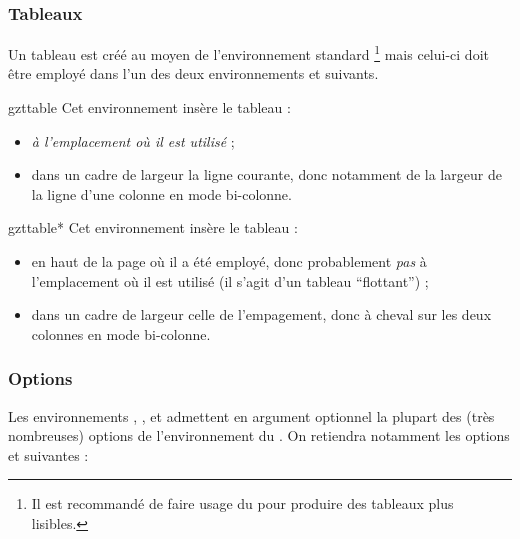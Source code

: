 \subsubsection{Tableaux}
\label{sec-tableaux}

Un tableau est créé au moyen de l'environnement standard
\footnote{Il est recommandé de faire usage du
   pour produire des tableaux plus lisibles.} mais celui-ci
doit être employé dans l'un des deux environnements  et
 suivants.

\begin{docEnvironment}[doclang/environment content=tableau créé avec \docAuxEnvironment{tabular}]{gzttable}{}
  Cet environnement insère le tableau :
  \begin{itemize}
  \item \emph{à l'emplacement où il est utilisé} ;
  \item dans un cadre de largeur la ligne courante, donc notamment de la largeur
    de la ligne d'une colonne en mode bi-colonne.
  \end{itemize}
\end{docEnvironment}

\begin{docEnvironment}[doclang/environment content=tableau créé avec \docAuxEnvironment{tabular}]{gzttable*}{}
  Cet environnement insère le tableau :
  \begin{itemize}
  \item en haut de la page où il a été employé, donc probablement \emph{pas}
    à l'emplacement où il est utilisé (il s'agit d'un tableau
    \enquote{flottant}) ;
  \item dans un cadre de largeur celle de l'empagement, donc à cheval sur les
    deux colonnes en mode bi-colonne.
  \end{itemize}
\end{docEnvironment}

\subsubsection{Options}
\label{sec-options-gzt}

Les environnements , ,  et
 admettent en argument optionnel la plupart des (très
nombreuses) options de l'environnement  du
. On retiendra notamment les options  et
 suivantes :

